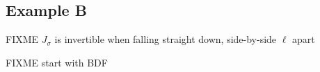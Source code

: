 \documentclass[letterpaper,final,12pt,reqno]{amsart}
\begin{document}
\subsection*{Example B}  FIXME $J_\sigma$ is invertible when falling straight down, side-by-side $\ell$ apart

FIXME start with BDF

\small

\bigskip


\end{document}
